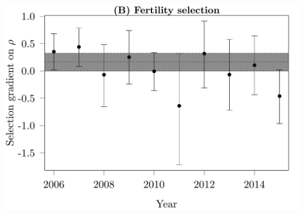 \documentclass{article}\usepackage[]{graphicx}\usepackage[]{color}
\makeatletter
\def\maxwidth{ %
  \ifdim\Gin@nat@width>\linewidth
    \linewidth
  \else
    \Gin@nat@width
  \fi
}
\newenvironment{kframe}{%
 \def\at@end@of@kframe{}%
 \ifinner\ifhmode%
  \def\at@end@of@kframe{\end{minipage}}%
  \begin{minipage}{\columnwidth}%
 \fi\fi%
 \def\FrameCommand##1{\hskip\@totalleftmargin \hskip-\fboxsep
 \colorbox{shadecolor}{##1}\hskip-\fboxsep
     \hskip-\linewidth \hskip-\@totalleftmargin \hskip\columnwidth}%
 \MakeFramed {\advance\hsize-\width
   \@totalleftmargin\z@ \linewidth\hsize
   \@setminipage}}%
 {\par\unskip\endMakeFramed%
 \at@end@of@kframe}
\newenvironment{knitrout}{}{} %
\makeatother
\begin{document}
\begin{knitrout}
\begin{kframe}
\begin{alltt}
\end{alltt}
\end{kframe}
\includegraphics[width=\maxwidth]{figure/SelByYearRho-1} 

\end{knitrout}
\end{document}
